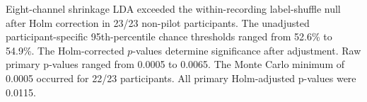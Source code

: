Eight-channel shrinkage LDA exceeded the within-recording label-shuffle null after Holm correction in 23/23 non-pilot participants. The unadjusted participant-specific 95th-percentile chance thresholds ranged from 52.6\% to 54.9\%. The Holm-corrected $p$-values determine significance after adjustment.
Raw primary p-values ranged from 0.0005 to 0.0065. The Monte Carlo minimum of 0.0005 occurred for 22/23 participants. All primary Holm-adjusted p-values were 0.0115.
